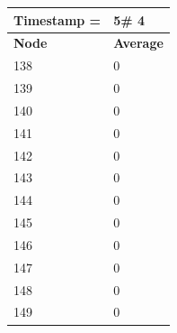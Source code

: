 \begin{tabular}{|l||l|}
\hline
\textbf{Timestamp =} & \textbf{5}\# 4\\\hline
	\textbf{Node} & \textbf{Average} \\ \hline
\hline
	138 & 0 \\ \hline
	139 & 0 \\ \hline
	140 & 0 \\ \hline
	141 & 0 \\ \hline
	142 & 0 \\ \hline
	143 & 0 \\ \hline
	144 & 0 \\ \hline
	145 & 0 \\ \hline
	146 & 0 \\ \hline
	147 & 0 \\ \hline
	148 & 0 \\ \hline
	149 & 0 \\ \hline
\end{tabular}

